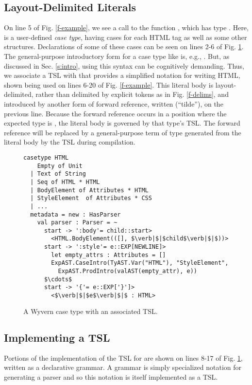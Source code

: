 \subsection{Layout-Delimited Literals}
On line 5 of Fig. \ref{f-example}, we see a call to the function , which has type . Here,  is a user-defined \emph{case type}, having cases for each HTML tag as well as some other structures. Declarations  of some of these cases can be seen on lines 2-6 of Fig. \ref{f-htmltype}. The general-purpose introductory form for a case type like  is, e.g., . But, as discussed in Sec. \ref{s:intro}, using this syntax can be cognitively demanding. Thus, we associate a TSL with  that provides a simplified notation for writing HTML, shown being used on lines 6-20 of Fig. \ref{f-example}. This literal body is layout-delimited, rather than delimited by explicit tokens as in Fig. \ref{f-delims}, and introduced by another form of forward reference, written \li{~} (``tilde''), on the previous line. Because the forward reference occurs in a position where the expected type is , the literal body is governed by that type's TSL. The forward reference will be replaced by a general-purpose term of type  generated from the literal body by the TSL during compilation.
\begin{figure}[t]
\begin{lstlisting}[escapechar=$]
casetype HTML 
    Empty of Unit
  | Text of String
  | Seq of HTML * HTML 
  | BodyElement of Attributes * HTML
  | StyleElement  of Attributes * CSS
  | ...
  metadata = new : HasParser
    val parser : Parser = ~
      start -> ':body'= child::start>
        <HTML.BodyElement(([], $\verb|$|$child$\verb|$|$))>
      start -> ':style'= e::EXP[NEWLINE]>
        let empty_attrs : Attributes = []
        ExpAST.CaseIntro(TyAST.Var("HTML"), "StyleElement",
          ExpAST.ProdIntro(valAST(empty_attr), e))
      $\cdots$
      start -> '{'= e::EXP['}']>
        <$\verb|$|$e$\verb|$|$ : HTML>
\end{lstlisting}
\vspace{-8px}
\caption{A Wyvern case type with an associated TSL.}
\vspace{-10px}
\label{f-htmltype}
\end{figure}

\subsection{Implementing a TSL}
Portions of the implementation of the TSL for  are shown on lines 8-17 of Fig. \ref{f-htmltype}, written as a declarative grammar. A grammar is simply specialized notation for generating a parser and so this notation is itself implemented as a TSL. 

